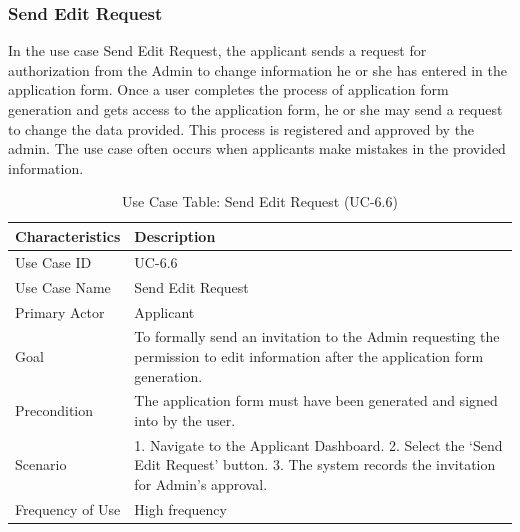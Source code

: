 \subsubsection{Send Edit Request}
In the use case Send Edit Request, the applicant sends a request for authorization from the Admin to change information he or she has entered in the application form. Once a user completes the process of application form generation and gets access to the application form, he or she may send a request to change the data provided. This process is registered and approved by the admin. The use case often occurs when applicants make mistakes in the provided information.
\begin{table}[H]
    \centering
    \small
    \renewcommand{\arraystretch}{1.4}
    \caption{Use Case Table: Send Edit Request (UC-6.6)}
    \label{tab:send_edit_request}
    
    \begin{tabularx}{\textwidth}{|l|X|}
        \hline
        \rowcolor[gray]{0.9} {Characteristics} & {Description} \\ \hline
        Use Case ID & UC-6.6 \\ \hline
        Use Case Name & Send Edit Request \\ \hline
        Primary Actor & Applicant \\ \hline
        Goal & To formally send an invitation to the Admin requesting the permission to edit information after the application form generation. \\ \hline
        Precondition & The application form must have been generated and signed into by the user. \\ \hline
        Scenario & 1. Navigate to the Applicant Dashboard. 2. Select the ‘Send Edit Request’ button. 3. The system records the invitation for Admin’s approval. \\ \hline
        Frequency of Use & High frequency \\ \hline
    \end{tabularx}
\end{table}
\FloatBarrier